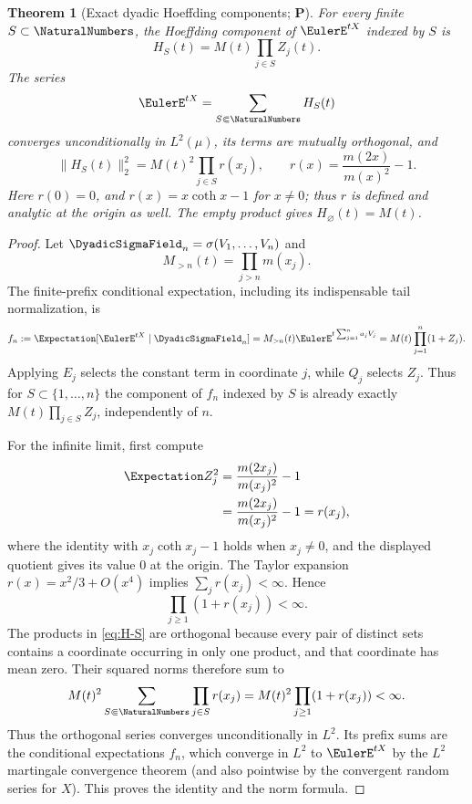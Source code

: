 \documentclass[11pt,oneside]{article}
\newtheorem{theorem}{Theorem}[section]
\theoremstyle{definition}
\theoremstyle{remark}
\newcommand{\statusP}{\textcolor{deepgreen}{\textbf{P}}}
\begin{document}
\begin{theorem}[Exact dyadic Hoeffding components; \statusP]
\label{thm:exact-Hoeffding}
For every finite $S\subset\NaturalNumbers$, the Hoeffding component of $\EulerE^{tX}$ indexed by
$S$ is
\begin{equation}
 H_S(t)=M(t)\prod_{j\in S}Z_j(t).
 \label{eq:H-S}
\end{equation}
The series
\begin{equation}
 \EulerE^{tX}=\sum_{S\Subset\NaturalNumbers}H_S(t)
 \label{eq:exp-Hoeffding-sum}
\end{equation}
converges unconditionally in $L^2(\mu)$, its terms are mutually orthogonal, and
\begin{equation}
 \boxed{
 \|H_S(t)\|_2^2=M(t)^2\prod_{j\in S}r(x_j),
 \qquad r(x)=\frac{m(2x)}{m(x)^2}-1.}
 \label{eq:H-S-norm}
\end{equation}
Here $r(0)=0$, and $r(x)=x\coth x-1$ for $x\ne0$; thus $r$ is defined and
analytic at the origin as well.
The empty product gives $H_\varnothing(t)=M(t)$.
\end{theorem}

\begin{proof}
Let $\DyadicSigmaField_n=\sigma(V_1,\ldots,V_n)$ and
\[
 M_{>n}(t)=\prod_{j>n}m(x_j).
\]
The finite-prefix conditional expectation, including its indispensable tail
normalization, is
\[
 f_n:=\Expectation[\EulerE^{tX}\mid\DyadicSigmaField_n]
 =M_{>n}(t)\EulerE^{t\sum_{j=1}^na_jV_j}
 =M(t)\prod_{j=1}^n(1+Z_j).
\]
Applying $E_j$ selects the constant term in coordinate $j$, while $Q_j$
selects $Z_j$.  Thus for $S\subset\{1,\ldots,n\}$ the component of $f_n$
indexed by $S$ is already exactly $M(t)\prod_{j\in S}Z_j$, independently of
$n$.

For the infinite limit, first compute
\begin{align*}
 \Expectation Z_j^2
 &=\frac{m(2x_j)}{m(x_j)^2}-1\\
 &=\frac{m(2x_j)}{m(x_j)^2}-1=r(x_j),
\end{align*}
where the identity with $x_j\coth x_j-1$ holds when $x_j\ne0$, and the
displayed quotient gives its value $0$ at the origin.
The Taylor expansion $r(x)=x^2/3+O(x^4)$ implies
$\sum_jr(x_j)<\infty$.  Hence
\[
 \prod_{j\ge1}(1+r(x_j))<\infty.
\]
The products in \eqref{eq:H-S} are orthogonal because every pair of distinct
sets contains a coordinate occurring in only one product, and that coordinate
has mean zero.  Their squared norms therefore sum to
\[
 M(t)^2\sum_{S\Subset\NaturalNumbers}\prod_{j\in S}r(x_j)
 =M(t)^2\prod_{j\ge1}(1+r(x_j))<\infty.
\]
Thus the orthogonal series converges unconditionally in $L^2$.  Its prefix
sums are the conditional expectations $f_n$, which converge in $L^2$ to
$\EulerE^{tX}$ by the $L^2$ martingale convergence theorem (and also pointwise by
the convergent random series for $X$).  This proves the identity and the norm
formula.
\end{proof}
\end{document}
